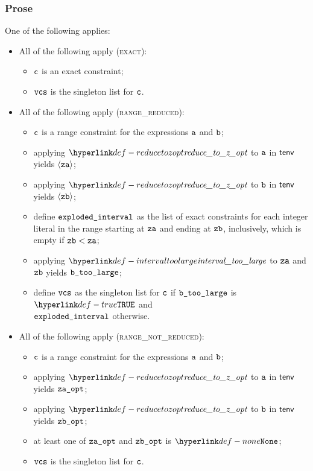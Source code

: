 \subsubsection{Prose}
One of the following applies:
\begin{itemize}
  \item All of the following apply (\textsc{exact}):
  \begin{itemize}
    \item $\texttt{c}$ is an exact constraint;
    \item $\texttt{vcs}$ is the singleton list for $\texttt{c}$.
  \end{itemize}

  \item All of the following apply (\textsc{range\_reduced}):
  \begin{itemize}
    \item $\texttt{c}$ is a range constraint for the expressions $\texttt{a}$ and $\texttt{b}$;
    \item applying $\reducetozopt$ to $\texttt{a}$ in $\textsf{tenv}$ yields $\langle\texttt{za}\rangle$;
    \item applying $\reducetozopt$ to $\texttt{b}$ in $\textsf{tenv}$ yields $\langle\texttt{zb}\rangle$;
    \item define $\texttt{exploded\_interval}$ as the list of exact constraints for each integer literal in the range starting
          at $\texttt{za}$ and ending at $\texttt{zb}$, inclusively, which is empty if $\texttt{zb} < \texttt{za}$;
    \item applying $\intervaltoolarge$ to $\texttt{za}$ and $\texttt{zb}$ yields $\texttt{b\_too\_large}$;
    \item define $\texttt{vcs}$ as the singleton list for $\texttt{c}$ if $\texttt{b\_too\_large}$ is $\True$ and \\
          $\texttt{exploded\_interval}$ otherwise.
  \end{itemize}

  \item All of the following apply (\textsc{range\_not\_reduced}):
  \begin{itemize}
    \item $\texttt{c}$ is a range constraint for the expressions $\texttt{a}$ and $\texttt{b}$;
    \item applying $\reducetozopt$ to $\texttt{a}$ in $\textsf{tenv}$ yields $\texttt{za\_opt}$;
    \item applying $\reducetozopt$ to $\texttt{b}$ in $\textsf{tenv}$ yields $\texttt{zb\_opt}$;
    \item at least one of $\texttt{za\_opt}$ and $\texttt{zb\_opt}$ is $\None$;
    \item $\texttt{vcs}$ is the singleton list for $\texttt{c}$.
  \end{itemize}
\end{itemize}

